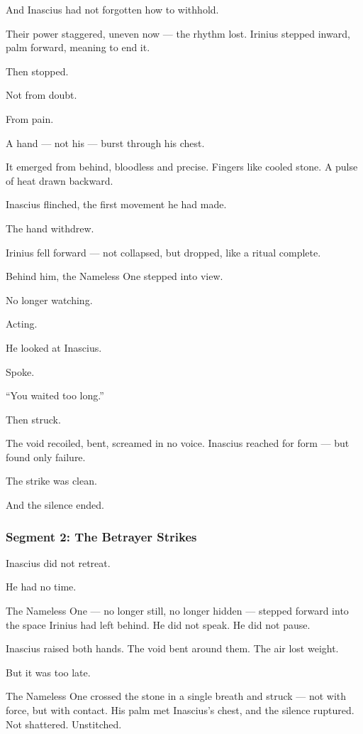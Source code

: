 \documentclass[9pt]{article}
\begin{document}
And Inascius had not forgotten how to withhold.

Their power staggered, uneven now — the rhythm lost. Irinius stepped inward, palm forward, meaning to end it.

Then stopped.

Not from doubt.

From pain.

A hand — not his — burst through his chest.

It emerged from behind, bloodless and precise. Fingers like cooled stone. A pulse of heat drawn backward.

Inascius flinched, the first movement he had made.

The hand withdrew.

Irinius fell forward — not collapsed, but dropped, like a ritual complete.

Behind him, the Nameless One stepped into view.

No longer watching.

Acting.

He looked at Inascius.

Spoke.

``You waited too long.''

Then struck.

The void recoiled, bent, screamed in no voice. Inascius reached for form — but found only failure.

The strike was clean.

And the silence ended.


\newpage

\subsubsection*{Segment 2: The Betrayer Strikes}

Inascius did not retreat.

He had no time.

The Nameless One — no longer still, no longer hidden — stepped forward into the space Irinius had left behind. He did not speak. He did not pause.

Inascius raised both hands. The void bent around them. The air lost weight.

But it was too late.

The Nameless One crossed the stone in a single breath and struck — not with force, but with contact. His palm met Inascius’s chest, and the silence ruptured. Not shattered. Unstitched.
\end{document}
